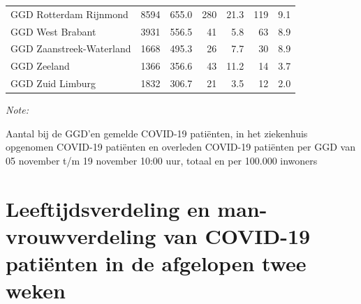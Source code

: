 \documentclass[
  english,
  man,floatsintext]{apa6}
\begin{document}
\begin{table}[H]
\begin{threeparttable}
\begin{tabular}{lrrrrrr}
GGD Rotterdam Rijnmond & 8594 & 655.0 & 280 & 21.3 & 119 & 9.1\\
GGD West Brabant & 3931 & 556.5 & 41 & 5.8 & 63 & 8.9\\
GGD Zaanstreek-Waterland & 1668 & 495.3 & 26 & 7.7 & 30 & 8.9\\
GGD Zeeland & 1366 & 356.6 & 43 & 11.2 & 14 & 3.7\\
GGD Zuid Limburg & 1832 & 306.7 & 21 & 3.5 & 12 & 2.0\\
\bottomrule
\end{tabular}
\begin{tablenotes}
\item \textit{Note: } 
\item Aantal bij de GGD’en gemelde COVID-19 patiënten, in het ziekenhuis opgenomen COVID-19 patiënten en overleden COVID-19 patiënten per GGD van 05 november t/m 19 november 10:00 uur, totaal en per 100.000 inwoners
\end{tablenotes}
\end{threeparttable}
\endgroup{}
\end{table}

\newpage

\hypertarget{leeftijdsverdeling-en-man-vrouwverdeling-van-covid-19-patiuxebnten-in-de-afgelopen-twee-weken}{%
\section{Leeftijdsverdeling en man-vrouwverdeling van COVID-19 patiënten in de afgelopen twee weken}\label{leeftijdsverdeling-en-man-vrouwverdeling-van-covid-19-patiuxebnten-in-de-afgelopen-twee-weken}}
\end{document}
